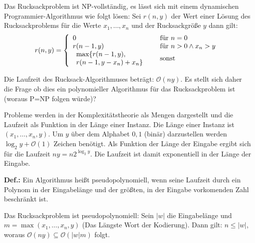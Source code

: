 Das Rucksackproblem ist NP-vollständig, es lässt sich mit einem dynamischen Pro\-gram\-mier-Algorithmus wie folgt lösen:
Sei \(r(n,y)\) der Wert einer Lösung des Rucksackproblems für die Werte \(x_{1}, \dots, x_{n}\) und der Rucksackgröße \(y\) dann gilt:
 \[r(n,y) = \left\{
			\begin{array}{l l}
				0 				& \quad \text{für } n=0\\
				r(n-1,y) 		& \quad \text{für } n>0 \wedge x_{n} > y \\
				\begin{array}{l l}
					\max \{
						r(n-1,y),\\
						r(n-1,y-x_{n})+x_{n}
					\}
				\end{array} & \quad \text{sonst}
		\end{array} \right.\]

Die Laufzeit des Rucksack-Algorithmuses beträgt: \(\mathcal{O}(ny)\).
Es stellt sich daher die Frage ob dies ein polynomieller Algorithmus für das Rucksackproblem ist (woraus P=NP folgen würde)?

Probleme werden in der Komplexitätstheorie als Mengen dargestellt und die Laufzeit als Funktion in der Länge einer Instanz.
Die Länge einer Instanz ist \((x_1, \dots, x_n, y)\).
Um \(y\) über dem Alphabet \({0,1}\) (binär) darzustellen werden \(\log_2y + \mathcal{O}(1)\) Zeichen benötigt.
Als Funktion der Länge der Eingabe ergibt sich für die Laufzeit \(ny = n2^{\log_2y}\).
Die Laufzeit ist damit exponentiell in der Länge der Eingabe.

\begin{shaded}
	\noindent
	\textbf{Def.:} Ein Algorithmus heißt pseudopolynomiell, wenn seine Laufzeit durch ein Polynom in der Eingabelänge und der größten, in der Eingabe vorkomenden Zahl beschränkt ist.
\end{shaded}
Das Rucksackproblem ist pseudopolynomiell: Sein \(|w|\) die Eingabelänge und \(m = \max(x_1, \dots, x_n, y)\) (Das Längste Wort der Kodierung).
Dann gilt: \(n\leq |w|\), woraus \(\mathcal{O}(ny) \subseteq \mathcal{O}(|w|m)\) folgt.